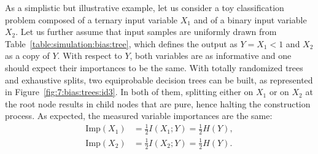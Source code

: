 As a simplistic but illustrative example, let us consider a toy classification
problem composed of a ternary input variable $X_1$ and of a binary input
variable $X_2$. Let us further assume that input samples are uniformly drawn
from Table~\ref{table:simulation:bias:tree}, which defines the output as $Y =
X_1 < 1$ and $X_2$ as a copy of $Y$. With respect to $Y$, both variables are as
informative and one should expect their importances to be the same.  With
totally randomized trees and exhaustive splits, two equiprobable decision trees
can be built, as represented in Figure~\ref{fig:7:bias:trees:id3}. In both of
them, splitting either on $X_1$ or on $X_2$ at the root node results in child
nodes that are pure, hence halting the construction process. As expected, the measured
variable importances are the same:
\begin{align*}
\text{Imp}(X_1) &= \frac{1}{2} I(X_1;Y) = \frac{1}{2} H(Y), \\
\text{Imp}(X_2) &= \frac{1}{2} I(X_2;Y) = \frac{1}{2} H(Y).
\end{align*}


